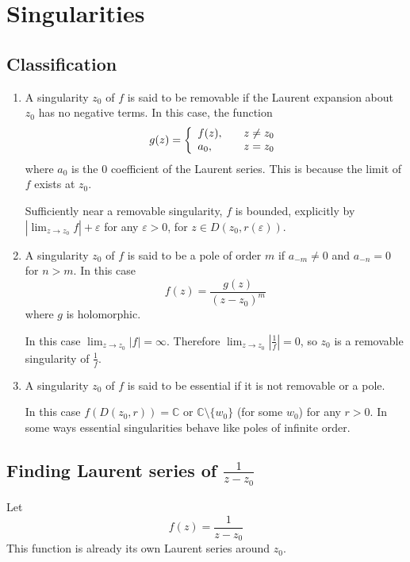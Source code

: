 \documentclass{article}
\begin{document}
\section{Singularities}

\subsection{Classification}

\begin{enumerate}
  \item{
    A singularity $z_0$ of $f$ is said to be removable if the Laurent
    expansion about $z_0$ has no negative terms. In this case, the
    function
    $$
      g(z)
    = \left\{
        \begin{array}{l l}
          f(z), & \quad z \neq z_0 \\
          a_0,  & \quad z = z_0
        \end{array}
      \right.
    $$
    where $a_0$ is the 0 coefficient of the Laurent series. This is
    because the limit of $f$ exists at $z_0$.

    Sufficiently near a removable singularity, $f$ is bounded,
    explicitly by $|\lim_{z \to z_0} f| + \varepsilon$ for any
    $\varepsilon > 0$, for $z \in D(z_0, r(\varepsilon))$.
  }
  \item{
    A singularity $z_0$ of $f$ is said to be a pole of order $m$ if
    $a_{-m} \neq 0$ and $a_{-n} = 0$ for $n > m$. In this case
    $$
      f(z)
    = \frac{g(z)}
           {(z - z_0)^m}
    $$
    where $g$ is holomorphic.

    In this case $\lim_{z \to z_0} |f| = \infty$. Therefore
    $\lim_{z \to z_0} \left|\frac{1}{f}\right| = 0$, so $z_0$ is a
    removable singularity of $\frac{1}{f}$.
  }
  \item{
    A singularity $z_0$ of $f$ is said to be essential if it is not
    removable or a pole.

    In this case
    $f(D(z_0, r)) = \mathbb{C}$ or $\mathbb{C} \setminus \{ w_0 \}$
    (for some $w_0$) for any $r > 0$. In some ways essential
    singularities behave like poles of infinite order.
  }
\end{enumerate}

\subsection{Finding Laurent series of $\frac{1}{z - z_0}$}
Let
$$
  f(z)
= \frac{1}{z - z_0}
$$
This function is already its own
Laurent series around $z_0$.
\end{document}

